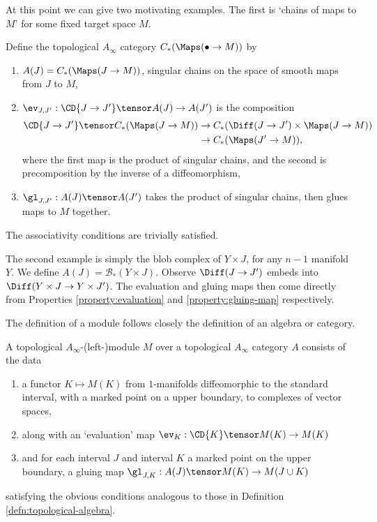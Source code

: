 \documentclass[11pt,leqno]{amsart}
\def\bc{{\mathcal B}}
\begin{document}
At this point we can give two motivating examples. The first is `chains of maps to $M$' for some fixed target space $M$.
\begin{defn}
Define the topological $A_\infty$ category $C_*(\Maps(\bullet \to M))$ by
\begin{enumerate}
\item $A(J) = C_*(\Maps(J \to M))$, singular chains on the space of smooth maps from $J$ to $M$,
\item $\ev_{J,J'} : \CD{J \to J'} \tensor A(J) \to A(J')$ is the composition
\begin{align*}
\CD{J \to J'} \tensor C_*(\Maps(J \to M)) & \to C_*(\Diff(J \to J') \times \Maps(J \to M)) \\ & \to C_*(\Maps(J' \to M)),
\end{align*}
where the first map is the product of singular chains, and the second is precomposition by the inverse of a diffeomorphism,
\item $\gl_{J,J'} : A(J) \tensor A(J')$ takes the product of singular chains, then glues maps to $M$ together.
\end{enumerate}
The associativity conditions are trivially satisfied.
\end{defn}

The second example is simply the blob complex of $Y \times J$, for any $n-1$ manifold $Y$. We define $A(J) = \bc_*(Y \times J)$.
Observe $\Diff(J \to J')$ embeds into $\Diff(Y \times J \to Y \times J')$. The evaluation and gluing maps then come directly from Properties
\ref{property:evaluation} and \ref{property:gluing-map} respectively.

The definition of a module follows closely the definition of an algebra or category.
\begin{defn}
\label{defn:topological-module}%
A topological $A_\infty$-(left-)module $M$ over a topological $A_\infty$ category $A$ consists of the data
\begin{enumerate}
\item a functor $K \mapsto M(K)$ from $1$-manifolds diffeomorphic to the standard interval, with a marked point on a upper boundary, to complexes of vector spaces,
\item along with an `evaluation' map $\ev_K : \CD{K} \tensor M(K) \to M(K)$
\item and for each interval $J$ and interval $K$ a marked point on the upper boundary, a gluing map
$\gl_{J,K} : A(J) \tensor M(K) \to M(J \cup K)$
\end{enumerate}
satisfying the obvious conditions analogous to those in Definition \ref{defn:topological-algebra}.
\end{defn}
\end{document}
